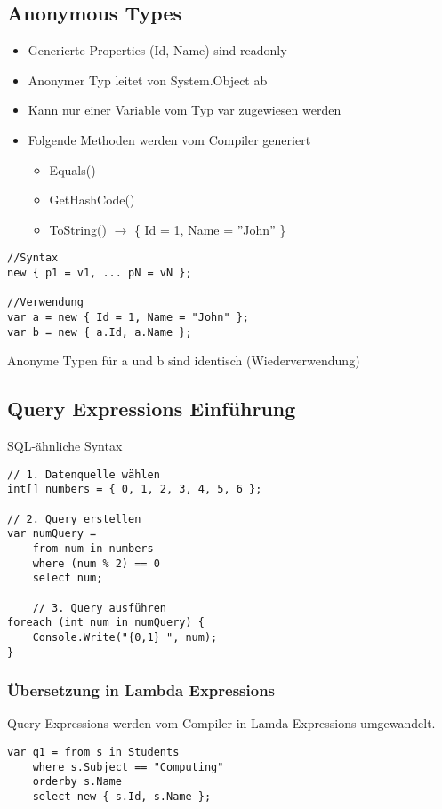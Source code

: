 \begin{multicols*}{2}
\subsection{Anonymous Types}
\begin{itemize}
    \item Generierte Properties (Id, Name) sind readonly
    \item Anonymer Typ leitet von System.Object ab
    \item Kann nur einer Variable vom Typ var zugewiesen werden
    \item Folgende Methoden werden vom Compiler generiert
    \begin{itemize}
        \item Equals()
        \item GetHashCode()
        \item ToString() $\rightarrow$ \{ Id = 1, Name = ''John'' \}
    \end{itemize}
\end{itemize}
\begin{lstlisting}
//Syntax
new { p1 = v1, ... pN = vN };

//Verwendung
var a = new { Id = 1, Name = "John" }; 
var b = new { a.Id, a.Name };
\end{lstlisting}
Anonyme Typen für a und b sind identisch (Wiederverwendung)

\subsection{Query Expressions Einführung}
SQL-ähnliche Syntax
\begin{lstlisting}
// 1. Datenquelle wählen
int[] numbers = { 0, 1, 2, 3, 4, 5, 6 };

// 2. Query erstellen
var numQuery =
    from num in numbers
    where (num % 2) == 0
    select num;

    // 3. Query ausführen
foreach (int num in numQuery) {
    Console.Write("{0,1} ", num);
}    
\end{lstlisting}
\subsubsection{Übersetzung in Lambda Expressions}
Query Expressions werden vom Compiler in Lamda Expressions umgewandelt.
\begin{lstlisting}
var q1 = from s in Students
    where s.Subject == "Computing"
    orderby s.Name
    select new { s.Id, s.Name };
\end{lstlisting}

\end{multicols*}
